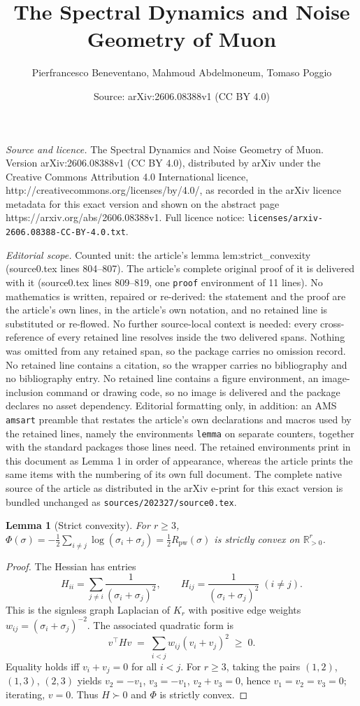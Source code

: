 \documentclass[10pt,a4paper]{amsart}
\title{The Spectral Dynamics and Noise Geometry of Muon}
\author{Pierfrancesco Beneventano, Mahmoud Abdelmoneum, Tomaso Poggio}
\date{Source: arXiv:2606.08388v1 (CC BY 4.0)}
\newtheorem{lemma}{Lemma}
\begin{document}
\maketitle

\noindent\emph{Source and licence.} The Spectral Dynamics and Noise Geometry of Muon. Version arXiv:2606.08388v1 (CC BY 4.0), distributed by arXiv under the Creative Commons Attribution 4.0 International licence, http://creativecommons.org/licenses/by/4.0/, as recorded in the arXiv licence metadata for this exact version and shown on the abstract page https://arxiv.org/abs/2606.08388v1. Full licence notice: \texttt{licenses/arxiv-2606.08388-CC-BY-4.0.txt}.\par\smallskip

\noindent\textit{Editorial scope.} Counted unit: the article's lemma lem:strict\_convexity (source0.tex lines 804--807). The article's complete original proof of it is delivered with it (source0.tex lines 809--819, one \texttt{proof} environment of 11 lines). No mathematics is written, repaired or re-derived: the statement and the proof are the article's own lines, in the article's own notation, and no retained line is substituted or re-flowed.  No further source-local context is needed: every cross-reference of every retained line resolves inside the two delivered spans.  Nothing was omitted from any retained span, so the package carries no omission record.  No retained line contains a citation, so the wrapper carries no bibliography and no bibliography entry.  No retained line contains a figure environment, an image-inclusion command or drawing code, so no image is delivered and the package declares no asset dependency.  Editorial formatting only, in addition: an AMS \texttt{amsart} preamble that restates the article's own declarations and macros used by the retained lines, namely the environments \texttt{lemma} on separate counters, together with the standard packages those lines need.  The retained environments print in this document as Lemma 1 in order of appearance, whereas the article prints the same items with the numbering of its own full document.  The complete native source of the article as distributed in the arXiv e-print for this exact version is bundled unchanged as \texttt{sources/202327/source0.tex}.
\begin{lemma}[Strict convexity]
\label{lem:strict_convexity}
For $r\geq 3$, $\Phi(\sigma) = -\tfrac12\sum_{i\neq j}\log(\sigma_i+\sigma_j) = \tfrac12 R_{\mathrm{pw}}(\sigma)$ is strictly convex on $\mathbb{R}^r_{>0}$.
\end{lemma}

\begin{proof}
The Hessian has entries
\[
H_{ii} = \sum_{j\neq i}\frac{1}{(\sigma_i+\sigma_j)^2},\qquad H_{ij}=\frac{1}{(\sigma_i+\sigma_j)^2}\;(i\neq j).
\]
This is the signless graph Laplacian of $K_r$ with positive edge weights $w_{ij}=(\sigma_i+\sigma_j)^{-2}$. The associated quadratic form is
\[
v^\top H v \;=\; \sum_{i<j} w_{ij}(v_i+v_j)^2 \;\geq\; 0.
\]
Equality holds iff $v_i+v_j=0$ for all $i<j$. For $r\geq 3$, taking the pairs $(1,2)$, $(1,3)$, $(2,3)$ yields $v_2 = -v_1$, $v_3=-v_1$, $v_2+v_3 = 0$, hence $v_1=v_2=v_3=0$; iterating, $v=0$. Thus $H\succ 0$ and $\Phi$ is strictly convex.
\end{proof}
\end{document}
